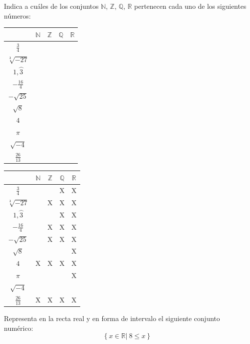 \documentclass[addpoints,spanish, 12pt,a4paper]{exam}
\begin{document}
\begin{questions}

\question[2] Indica a cuáles de los conjuntos
$\mathbb{N}$, $\mathbb{Z}$, $\mathbb{Q}$, $\mathbb{R}$ pertenecen cada uno de los siguientes números:
\begin{center}
\begin{tabular}{|c |c |c |c |c|}\hline
&$\mathbb{N}$& $\mathbb{Z}$& $\mathbb{Q}$&$\mathbb{R}$\\ 
\hline
$\frac{3}{4}$&&&&\\
\hline
$\sqrt[3]{-27}$&&&&\\
\hline
$1,\wideparen{3}$&&&&\\
\hline
$-\frac{16}{4}$&&&&\\
\hline
$-\sqrt{25}$&&&&\\
\hline
$\sqrt{8}$&&&&\\
\hline
$4$&&&&\\
\hline
$\pi$&&&&\\
\hline
$\sqrt{-4}$&&&&\\
\hline
$\frac{26}{13}$&&&&\\
\hline
\end{tabular}

\end{center}

\begin{solution}
\begin{tabular}{|c |c |c |c |c|}\hline
&$\mathbb{N}$& $\mathbb{Z}$& $\mathbb{Q}$&$\mathbb{R}$\\ 
\hline
$\frac{3}{4}$&&&X&X\\
\hline
$\sqrt[3]{-27}$&&X&X&X\\
\hline
$1,\wideparen{3}$&&&X&X\\
\hline
$-\frac{16}{4}$&&X&X&X\\
\hline
$-\sqrt{25}$&&X&X&X\\
\hline
$\sqrt{8}$&&&&X\\
\hline
$4$&X&X&X&X\\
\hline
$\pi$&&&&X\\
\hline
$\sqrt{-4}$&&&&\\
\hline
$\frac{26}{13}$&X&X&X&X\\
\hline
\end{tabular}
\end{solution}

\addpoints

\question[1] Representa en la recta real y en forma de intervalo el siguiente conjunto numérico:
\addpoints %
$$\left\{ x \in \mathbb{R} \left| \ 8 \leqslant x  \right. \right\}$$


\end{questions}
\end{document}
